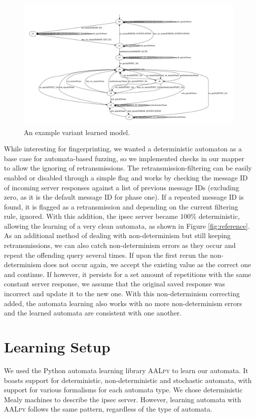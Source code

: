 \begin{figure}[h]
	\centering
	\includegraphics[width=0.7\linewidth]{images/models/NoFilterB}
	\caption{An example variant learned model.}
	\label{fig:nofilterb}
\end{figure}

While interesting for fingerprinting, we wanted a deterministic automaton as a base case for automata-based fuzzing, so we implemented checks in our mapper to allow the ignoring of retransmissions. The retransmission-filtering can be easily enabled or disabled through a simple flag and works by checking the message ID of incoming server responses against a list of previous message IDs (excluding zero, as it is the default message ID for phase one). If a repeated message ID is found, it is flagged as a retransmission and depending on the current filtering rule, ignored. With this addition, the \ac{ipsec} server became 100\% deterministic, allowing the learning of a very clean automata, as shown in Figure \ref{fig:reference}. As an additional method of dealing with non-determinism but still keeping retransmissions, we can also catch non-determinism errors as they occur and repeat the offending query several times. If upon the first rerun the non-determinism does not occur again, we accept the existing value as the correct one and continue. If however, it persists for a set amount of repetitions with the same constant server response, we assume that the original saved response was incorrect and update it to the new one. With this non-determinism correcting added, the automata learning also works with no more non-determinism errors and the learned automata are consistent with one another.


\section{Learning Setup} \label{subsec:learningenv}%
We used the Python automata learning library \textsc{AALpy} to learn our automata. It boasts support for deterministic, non-deterministic and stochastic automata, with support for various formalisms for each automata type. We chose deterministic Mealy machines to describe the \ac{ipsec} server. However, learning automata with \textsc{AALpy} follows the same pattern, regardless of the type of automata.

